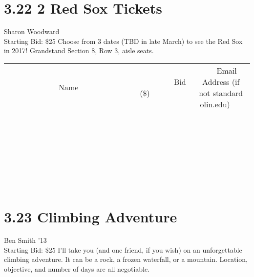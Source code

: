 \documentclass[11pt]{article}
\begin{document}
\section*{3.22 2 Red Sox Tickets }
Sharon Woodward
\\
Starting Bid: \$25
\newline
Choose from 3 dates (TBD in late March) to see the Red Sox in 2017!  Grandstand Section 8, Row 3, aisle seats.
\\[6ex]
\begin{tabular}{c c c}
~~~~~~~~~~~~~Name~~~~~~~~~~~~~ & ~~~~~~~~~Bid (\$)~~~~~~~~~  & ~~~Email Address (if not standard olin.edu)~~~\\
 & & \\
\hline
 & & \\
\hline
 & & \\
\hline
 & & \\
\hline
 & & \\
\hline
 & & \\
\hline
 & & \\
\hline
 & & \\
\hline
 & & \\
\hline
 & & \\
\hline
 & & \\
\hline
 & & \\
\hline
 & & \\
\hline
 & & \\
\hline
 & & \\
\hline
 & & \\
\hline
 & & \\
\hline
 & & \\
\hline
 & & \\
\hline
 & & \\
\hline
 & & \\
\hline
 & & \\
\hline
 & & \\
\hline
 & & \\
\hline
 & & \\
\hline
 & & \\
\hline
\end{tabular}
\newpage
\section*{3.23 Climbing Adventure}
Ben Smith '13
\\
Starting Bid: \$25
\newline
I'll take you (and one friend, if you wish) on an unforgettable climbing adventure. It can be a rock, a frozen waterfall, or a mountain. Location, objective, and number of days are all negotiable. 
\end{document}
